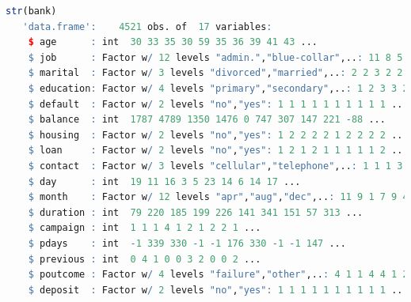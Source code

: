 \documentclass[
  11pt,
]{book}
\theoremstyle{definition}
\theoremstyle{definition}
\theoremstyle{definition}
\theoremstyle{definition}
\theoremstyle{remark}
\begin{document}
\begin{lstlisting}[language=R]
str(bank)
   'data.frame':    4521 obs. of  17 variables:
    $ age      : int  30 33 35 30 59 35 36 39 41 43 ...
    $ job      : Factor w/ 12 levels "admin.","blue-collar",..: 11 8 5 5 2 5 7 10 3 8 ...
    $ marital  : Factor w/ 3 levels "divorced","married",..: 2 2 3 2 2 3 2 2 2 2 ...
    $ education: Factor w/ 4 levels "primary","secondary",..: 1 2 3 3 2 3 3 2 3 1 ...
    $ default  : Factor w/ 2 levels "no","yes": 1 1 1 1 1 1 1 1 1 1 ...
    $ balance  : int  1787 4789 1350 1476 0 747 307 147 221 -88 ...
    $ housing  : Factor w/ 2 levels "no","yes": 1 2 2 2 2 1 2 2 2 2 ...
    $ loan     : Factor w/ 2 levels "no","yes": 1 2 1 2 1 1 1 1 1 2 ...
    $ contact  : Factor w/ 3 levels "cellular","telephone",..: 1 1 1 3 3 1 1 1 3 1 ...
    $ day      : int  19 11 16 3 5 23 14 6 14 17 ...
    $ month    : Factor w/ 12 levels "apr","aug","dec",..: 11 9 1 7 9 4 9 9 9 1 ...
    $ duration : int  79 220 185 199 226 141 341 151 57 313 ...
    $ campaign : int  1 1 1 4 1 2 1 2 2 1 ...
    $ pdays    : int  -1 339 330 -1 -1 176 330 -1 -1 147 ...
    $ previous : int  0 4 1 0 0 3 2 0 0 2 ...
    $ poutcome : Factor w/ 4 levels "failure","other",..: 4 1 1 4 4 1 2 4 4 1 ...
    $ deposit  : Factor w/ 2 levels "no","yes": 1 1 1 1 1 1 1 1 1 1 ...
\end{lstlisting}
\end{document}
